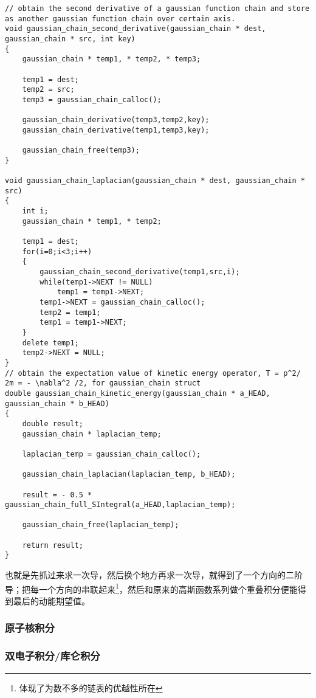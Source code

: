 \documentclass[12pt,a4paper,openany,twoside]{article}
\numberwithin{equation}{section}
\begin{document}
                \begin{lstlisting}
// obtain the second derivative of a gaussian function chain and store as another gaussian function chain over certain axis.
void gaussian_chain_second_derivative(gaussian_chain * dest, gaussian_chain * src, int key)
{
    gaussian_chain * temp1, * temp2, * temp3;

    temp1 = dest;
    temp2 = src;
    temp3 = gaussian_chain_calloc();
    
    gaussian_chain_derivative(temp3,temp2,key);
    gaussian_chain_derivative(temp1,temp3,key);

    gaussian_chain_free(temp3);
}

void gaussian_chain_laplacian(gaussian_chain * dest, gaussian_chain * src)
{
    int i;
    gaussian_chain * temp1, * temp2;

    temp1 = dest;
    for(i=0;i<3;i++)
    {
        gaussian_chain_second_derivative(temp1,src,i);
        while(temp1->NEXT != NULL)
            temp1 = temp1->NEXT;
        temp1->NEXT = gaussian_chain_calloc();
        temp2 = temp1;
        temp1 = temp1->NEXT;
    }
    delete temp1;
    temp2->NEXT = NULL;
}
// obtain the expectation value of kinetic energy operator, T = p^2/ 2m = - \nabla^2 /2, for gaussian_chain struct
double gaussian_chain_kinetic_energy(gaussian_chain * a_HEAD, gaussian_chain * b_HEAD)
{
    double result;
    gaussian_chain * laplacian_temp;

    laplacian_temp = gaussian_chain_calloc();

    gaussian_chain_laplacian(laplacian_temp, b_HEAD);

    result = - 0.5 * gaussian_chain_full_SIntegral(a_HEAD,laplacian_temp);

    gaussian_chain_free(laplacian_temp);

    return result;
}
                \end{lstlisting}
                也就是先抓过来求一次导，然后换个地方再求一次导，就得到了一个方向的二阶导；把每一个方向的串联起来\footnote{体现了为数不多的链表的优越性所在}，然后和原来的高斯函数系列做个重叠积分便能得到最后的动能期望值。
                \subsubsection{原子核积分}
                \subsubsection{双电子积分/库仑积分}



    
\end{document}
